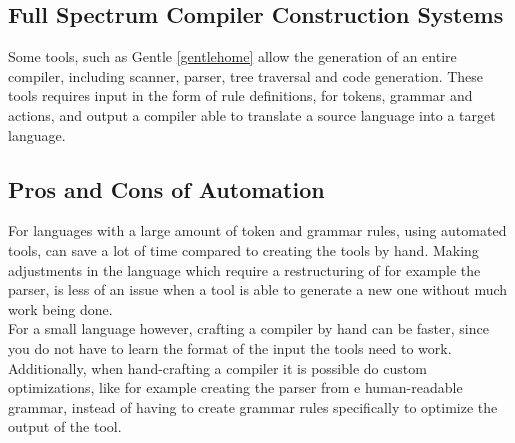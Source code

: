   \subsection{Full Spectrum Compiler Construction Systems}
  
    Some tools, such as Gentle \ref{gentlehome} allow the generation of an entire compiler, including
    scanner, parser, tree traversal and code generation. These tools requires input in the form of
    rule definitions, for tokens, grammar and actions, and output a compiler able to translate a source
    language into a target language.
    
  \subsection{Pros and Cons of Automation}

	For languages with a large amount of token and grammar rules, using automated tools, can save
	a lot of time compared to creating the tools by hand. Making adjustments in the language which
	require a restructuring of for example the parser, is less of an issue when a tool is able to
	generate a new one without much work being done.
	\\
	For a small language however, crafting a compiler by hand can be faster, since you do not have
	to learn the format of the input the tools need to work. Additionally, when hand-crafting a compiler
	it is possible do custom optimizations, like for example creating the parser from e human-readable
	grammar, instead of having to create grammar rules specifically to optimize the output of the tool.
	
    
